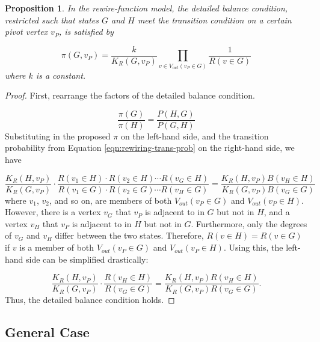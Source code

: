 \documentclass[a4paper,10pt]{article}
\newtheorem{prop}{Proposition}
\begin{document}
\begin{prop}
\label{prop:rewire-restricted}
 In the rewire-function model, the detailed balance condition, restricted such that states $G$ and $H$ meet the transition condition on a certain pivot vertex $v_P$, is satisfied by

 \begin{equation}
 \label{eqn:pi-k1-rewire}
  \pi(G, v_P) = \frac{k}{K_R(G, v_P)} 
 \prod \limits_{v \in V_{out}(v_P \in G)} \frac{1}{R(v \in G)}
 \end{equation}
where $k$ is a constant.
\end{prop}

\begin{proof}
First, rearrange the factors of the detailed balance condition. 

\begin{equation}
 \frac{\pi(G)}{\pi(H)} = \frac{P(H, G)}{P(G, H)}
\end{equation}
Substituting in the proposed $\pi$ on the left-hand side, and the transition probability from Equation \ref{eqn:rewiring-trans-prob} on the right-hand side, we have

\begin{equation}
 \frac{K_R(H, v_P)}{K_R(G, v_P)} \cdot \frac{R(v_1 \in H) \cdot R(v_2 \in H) \cdots R(v_G \in H)}
{R(v_1 \in G) \cdot R(v_2 \in G) \cdots R(v_H \in G)} = 
\frac{K_R(H, v_P) B(v_H \in H)}{K_R(G, v_P) B(v_G \in G)}
\end{equation}
where $v_1$, $v_2$, and so on, are members of both $V_{out}(v_P \in G)$ and $V_{out}(v_P \in H)$. However, there is a vertex $v_G$ that $v_P$ is adjacent to in $G$ but not in $H$, and a vertex $v_H$ that $v_P$ is adjacent to in $H$ but not in $G$. Furthermore, only the degrees of $v_G$ and $v_H$ differ between the two states. Therefore, $R(v \in H) = R(v \in G)$ if $v$ is a member of both $V_{out}(v_P \in G)$ and $V_{out}(v_P \in H)$. Using this, the left-hand side can be simplified drastically:

\begin{equation}
  \frac{K_R(H, v_P)}{K_R(G, v_P)} \cdot \frac{R(v_H \in H)}{R(v_G \in G)} = 
\frac{K_R(H, v_P) R(v_H \in H)}{K_R(G, v_P) R(v_G \in G)}.
\end{equation}
Thus, the detailed balance condition holds.

\end{proof}

\subsection{General Case}
\end{document}

